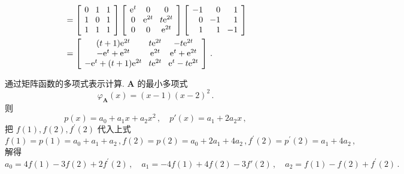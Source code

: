 \documentclass[list,answers,csize4,custom]{sysuexam}
\begin{document}
\begin{groups}
\begin{questions}[rst]
\begin{solution}[10cm]
$$\begin{aligned}
			                         & =\left[\lk\begin{array}{ccc}
					0 & 1 & 1 \\
					1 & 0 & 1 \\
					1 & 1 & 1
				\end{array}\right]\left[\lk\begin{array}{ccc}
					\mathrm{e}^{t} & 0                & 0                  \\
					0              & \mathrm{e}^{2 t} & t \mathrm{e}^{2 t} \\
					0              & 0                & \mathrm{e}^{2 t}
				\end{array}\right]\left[\lk\begin{array}{rrr}
					-1 & 0  & 1  \\
					0  & -1 & 1  \\
					1  & 1  & -1
				\end{array}\right]                                                                    \\
			                         & =\left[\lk\begin{array}{ccc}
					(t+1) \mathrm{e}^{2 t}                 & t \mathrm{e}^{2 t} & -t \mathrm{e}^{2 t}               \\
					-\mathrm{e}^{t}+\mathrm{e}^{2 t}       & \mathrm{e}^{2 t}   & \mathrm{e}^{t}+\mathrm{e}^{2 t}   \\
					-\mathrm{e}^{t}+(t+1) \mathrm{e}^{2 t} & t \mathrm{e}^{2 t} & \mathrm{e}^{t}-t \mathrm{e}^{2 t}
				\end{array}\right]\,.
		\end{aligned}
    $$

    \sj \method 通过矩阵函数的多项式表示计算. $\symbf{A}$ 的最小多项式
	$$
		\varphi_{\symbf{A}}(x)=(x-1)(x-2)^{2}\,.
	$$
	则
	$$
		p(x)=a_{0}+a_{1} x+a_2 x^2\,, \quad p'(x)=a_{1}+2a_2 x\,,
	$$
	把 $f(1),f(2), f^{\prime}(2)$ 代入上式
	$$
		f(1)=p(1)=a_0+a_1+a_2\,, f(2)=p(2)=a_{0}+2 a_{1}+4a_2\,, f^{\prime}(2)=p^{\prime}(2)=a_{1}+4a_2\,,
	$$
	解得
	$$
		a_{0}=4f(1)-3f(2)+2 f^{\prime}(2)\,, \quad a_{1}=-4f(1)+4f(2)-3f'(2)\,, \quad a_2=f(1)-f(2)+f^{\prime}(2)\,.
	$$
    

\end{solution}
\end{questions}
\end{groups}
\end{document}

